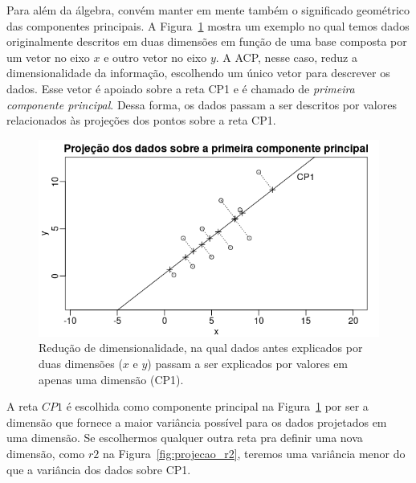 \documentclass[
	article,			%
	12pt,				%
    twoside,			%
	a4paper,			%
	english,			%
	french,				%
	spanish,			%
	brazil,				%
	]{abntex2}
\begin{document}
Para além da álgebra, convém manter em mente também o significado geométrico das componentes principais. A Figura~\ref{fig:projecao_cp1} mostra um exemplo no qual temos dados originalmente descritos em duas dimensões em função de uma base composta por um vetor no eixo $x$ e outro vetor no eixo $y$. A ACP, nesse caso, reduz a dimensionalidade da informação, escolhendo um único vetor para descrever os dados. Esse vetor é apoiado sobre a reta CP1 e é chamado de \emph{primeira componente principal}. Dessa forma, os dados passam a ser descritos por valores relacionados às projeções dos pontos sobre a reta CP1. 

\begin{figure}[h]
  \centering
  \includegraphics[scale=0.7]{figs/projecao_cp1.png}
  \caption{Redução de dimensionalidade, na qual dados antes explicados por duas dimensões ($x$ e $y$) passam a ser explicados por valores em apenas uma dimensão (CP1).}
  \label{fig:projecao_cp1}
\end{figure}

A reta $CP1$ é escolhida como componente principal na Figura~\ref{fig:projecao_cp1} por ser a dimensão que fornece a maior variância possível para os dados projetados em uma dimensão. Se escolhermos qualquer outra reta pra definir uma nova dimensão, como $r2$ na Figura~\ref{fig:projecao_r2}, teremos uma variância menor do que a variância dos dados sobre CP1.
\end{document}
